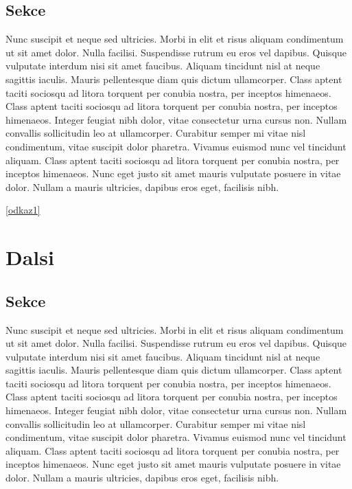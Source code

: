 \documentclass{report}
\begin{document}
	\section{Sekce}
	Nunc suscipit et neque sed ultricies. Morbi in elit et risus aliquam 
	condimentum ut sit amet dolor. Nulla facilisi. Suspendisse rutrum eu 
	eros vel dapibus. Quisque vulputate interdum nisi sit amet faucibus. 
	Aliquam tincidunt nisl at neque sagittis iaculis.  Mauris pellentesque 
	diam quis dictum ullamcorper. Class aptent taciti sociosqu ad litora 
	torquent per conubia nostra, per inceptos himenaeos. Class aptent 
	taciti sociosqu ad litora torquent per conubia nostra, per inceptos 
	himenaeos. Integer feugiat nibh dolor, vitae consectetur urna cursus 
	non. Nullam convallis sollicitudin leo at ullamcorper. Curabitur semper 
	mi vitae nisl condimentum, vitae suscipit dolor pharetra. Vivamus 
	euismod nunc vel tincidunt aliquam. Class aptent taciti sociosqu ad 
	litora torquent per conubia nostra, per inceptos himenaeos. Nunc eget 
	justo sit amet mauris vulputate posuere in vitae dolor. Nullam a mauris 
	ultricies, dapibus eros eget, facilisis nibh.

	\ref{odkaz1} 
	
	\chapter{Dalsi}
	
	\section{Sekce}
	Nunc suscipit et neque sed ultricies. Morbi in elit et risus aliquam 
	condimentum ut sit amet dolor. Nulla facilisi. Suspendisse rutrum eu 
	eros vel dapibus. Quisque vulputate interdum nisi sit amet faucibus. 
	Aliquam tincidunt nisl at neque sagittis iaculis.  Mauris pellentesque 
	diam quis dictum ullamcorper. Class aptent taciti sociosqu ad litora 
	torquent per conubia nostra, per inceptos himenaeos. Class aptent 
	taciti sociosqu ad litora torquent per conubia nostra, per inceptos 
	himenaeos. Integer feugiat nibh dolor, vitae consectetur urna cursus 
	non. Nullam convallis sollicitudin leo at ullamcorper. Curabitur semper 
	mi vitae nisl condimentum, vitae suscipit dolor pharetra. Vivamus 
	euismod nunc vel tincidunt aliquam. Class aptent taciti sociosqu ad 
	litora torquent per conubia nostra, per inceptos himenaeos. Nunc eget 
	justo sit amet mauris vulputate posuere in vitae dolor. Nullam a mauris 
	ultricies, dapibus eros eget, facilisis nibh.
	
\end{document}
